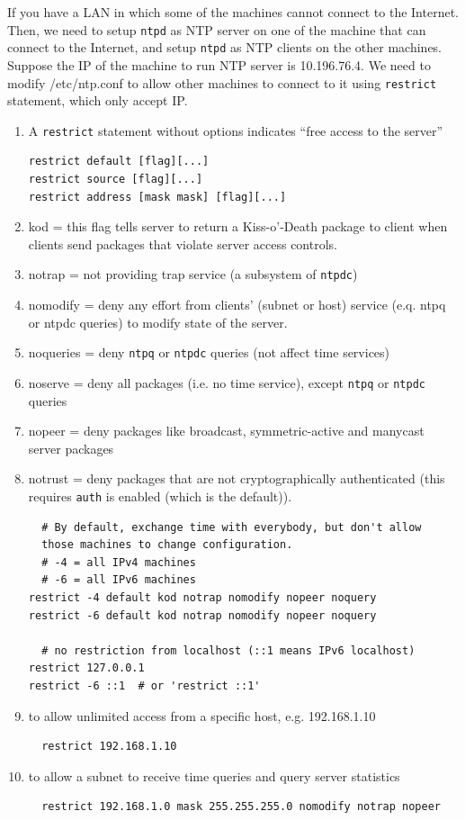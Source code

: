 If you have a LAN in which some of the machines cannot connect to the Internet.
Then, we need to setup \verb!ntpd! as NTP server on one of the machine that can
connect to the Internet, and setup \verb!ntpd! as NTP clients on the other
machines. Suppose the IP of the machine to run NTP server is 10.196.76.4. We
need to modify /etc/ntp.conf to allow other machines to connect to it using
\verb!restrict! statement, which only accept IP.
\begin{enumerate}
  \item A \verb!restrict! statement without options indicates ``free access to
  the server''
  \begin{verbatim}
restrict default [flag][...]
restrict source [flag][...]
restrict address [mask mask] [flag][...]
  \end{verbatim}
  
  \item kod = this flag tells server to return a Kiss-o'-Death package to
  client when clients send packages that violate server access controls.
  \item notrap = not providing trap service (a subsystem of \verb!ntpdc!)
  \item nomodify = deny any effort from clients' (subnet or host) service (e.q.
  ntpq or ntpdc queries) to modify state of the server.
  \item noqueries = deny \verb!ntpq! or \verb!ntpdc! queries (not affect time
  services)
  \item noserve = deny all packages (i.e. no time service), except \verb!ntpq!
  or \verb!ntpdc! queries
  \item nopeer = deny packages like broadcast, symmetric-active and manycast
  server packages
  \item notrust = deny packages that are not cryptographically authenticated
  (this requires \verb!auth! is enabled (which is the default)). 
  \begin{verbatim}
  # By default, exchange time with everybody, but don't allow
  those machines to change configuration.
  # -4 = all IPv4 machines
  # -6 = all IPv6 machines
restrict -4 default kod notrap nomodify nopeer noquery                                                                                                                 
restrict -6 default kod notrap nomodify nopeer noquery
  
  # no restriction from localhost (::1 means IPv6 localhost)
restrict 127.0.0.1
restrict -6 ::1  # or 'restrict ::1'
  \end{verbatim}
  
  \item to allow unlimited access from a specific host, e.g. 192.168.1.10
  \begin{verbatim}
  restrict 192.168.1.10
  \end{verbatim}
  
  \item to allow a subnet to receive time queries and query server statistics
  \begin{verbatim}
  restrict 192.168.1.0 mask 255.255.255.0 nomodify notrap nopeer
  \end{verbatim}
\end{enumerate}
